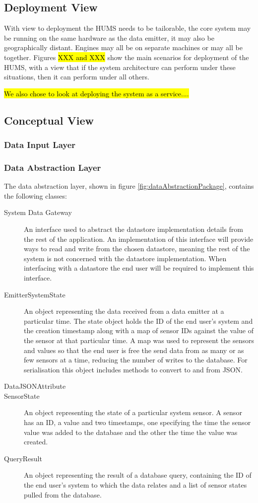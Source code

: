 \documentclass[10pt,a4paper]{article}
\begin{document}
\subsection{Deployment View}
With view to deployment the HUMS needs to be tailorable, the core system may be running on the same hardware as the data emitter, it may also be geographically distant. Engines may all be on separate machines or may all be together. Figures \hl{XXX and XXX} show the main scenarios for deployment of the HUMS, with a view that if the system architecture can perform under these situations, then it can perform under all others.

\hl{We also chose to look at deploying the system as a service....}

\subsection{Conceptual View}
\subsubsection{Data Input Layer}
\subsubsection{Data Abstraction Layer}

The data abstraction layer, shown in figure \ref{fig:dataAbstractionPackage}, contains the following classes:
\begin{description}
\item [System Data Gateway]  An interface used to abstract the datastore implementation details from the rest of the application. An implementation of this interface will provide ways to read and write from the chosen datastore, meaning the rest of the system is not concerned with the datastore implementation. When interfacing with a datastore the end user will be required to implement this interface.
\item [EmitterSystemState] An object representing the data received from a data emitter at a particular time. The state object holds the ID of the end user's system and the creation timestamp along with a map of sensor IDs against the value of the sensor at that particular time. A map was used to represent the sensors and values so that the end user is free the send data from as many or as few sensors at a time, reducing the number of writes to the database. For serialisation this object includes methods to convert to and from JSON.
\item [DataJSONAttribute] 
\item [SensorState] An object representing the state of a particular system sensor. A sensor has an ID, a value and two timestamps, one specifying the time the sensor value was added to the database and the other the time the value was created.
\item [QueryResult] An object representing the result of a database query, containing the ID of the end user's system to which the data relates and a list of sensor states pulled from the database.


\end{description}
\end{document}
